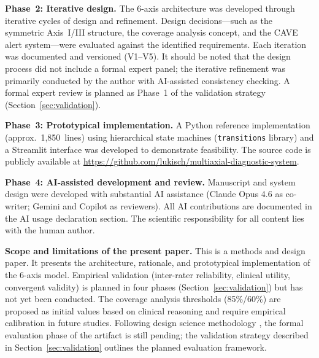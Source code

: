 \documentclass[11pt,a4paper]{article}
\begin{document}
\textbf{Phase~2: Iterative design.} The 6-axis architecture was developed through iterative cycles of design and refinement. Design decisions---such as the symmetric Axis~I/III structure, the coverage analysis concept, and the CAVE alert system---were evaluated against the identified requirements. Each iteration was documented and versioned (V1--V5). It should be noted that the design process did not include a formal expert panel; the iterative refinement was primarily conducted by the author with AI-assisted consistency checking. A formal expert review is planned as Phase~1 of the validation strategy (Section~\ref{sec:validation}).

\textbf{Phase~3: Prototypical implementation.} A Python reference implementation (approx.\ 1,850~lines) using hierarchical state machines (\texttt{transitions} library) and a Streamlit interface was developed to demonstrate feasibility. The source code is publicly available at \url{https://github.com/lukisch/multiaxial-diagnostic-system}.

\textbf{Phase~4: AI-assisted development and review.} Manuscript and system design were developed with substantial AI assistance (Claude Opus 4.6 as co-writer; Gemini and Copilot as reviewers). All AI contributions are documented in the AI usage declaration section. The scientific responsibility for all content lies with the human author.

\textbf{Scope and limitations of the present paper.} This is a methods and design paper. It presents the architecture, rationale, and prototypical implementation of the 6-axis model. Empirical validation (inter-rater reliability, clinical utility, convergent validity) is planned in four phases (Section~\ref{sec:validation}) but has not yet been conducted. The coverage analysis thresholds (85\%/60\%) are proposed as initial values based on clinical reasoning and require empirical calibration in future studies. Following design science methodology \citep{Hevner2004, Peffers2007}, the formal evaluation phase of the artifact is still pending; the validation strategy described in Section~\ref{sec:validation} outlines the planned evaluation framework.
\end{document}
